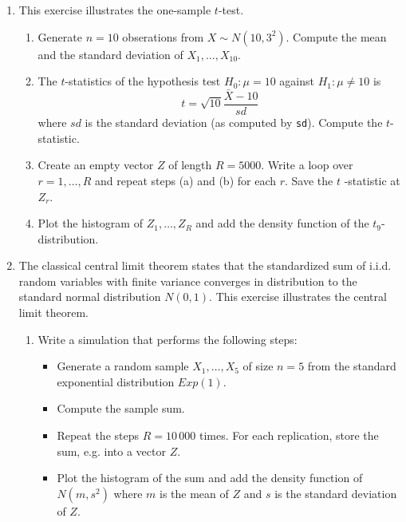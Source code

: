 \documentclass{article}
\begin{document}
\begin{enumerate}
\item This exercise illustrates the one-sample $t$-test.

\begin{enumerate}
\item Generate $n=10$ obserations from $X\sim N(10,3^{2})$. Compute the mean
and the standard deviation of $X_{1},\ldots ,X_{10}$.

\item The $t$-statistics of the hypothesis test $H_{0}:\mu =10$ against $%
H_{1}:\mu \neq 10$ is%
\begin{equation*}
t=\sqrt{10}\frac{\bar{X}-10}{sd}
\end{equation*}%
where $sd$ is the standard deviation (as computed by \texttt{sd}). Compute
the $t$-statistic.

\item Create an empty vector $Z$ of length $R=5000$. Write a loop over $%
r=1,\ldots ,R$ and repeat steps (a) and (b) for each $r$. Save the $t$%
-statistic at $Z_{r}$.

\item Plot the histogram of $Z_{1},\ldots ,Z_{R}$ and add the density
function of the $t_{9}$-distribution.
\end{enumerate}

\item The classical central limit theorem states that the standardized sum
of i.i.d. random variables with finite variance converges in distribution to
the standard normal distribution $N(0,1)$. This exercise illustrates the
central limit theorem.

\begin{enumerate}
\item Write a simulation that performs the following steps:

\begin{itemize}
\item Generate a random sample $X_{1},\ldots ,X_{5}$ of size $n=5$ from the
standard exponential distribution $Exp(1)$.

\item Compute the sample sum.

\item Repeat the steps $R=10\,000$ times. For each replication, store the
sum, e.g. into a vector $Z$.

\item Plot the histogram of the sum and add the density function of $%
N(m,s^{2})$ where $m$ is the mean of $Z$ and $s$ is the standard deviation
of $Z$.
\end{itemize}


\end{enumerate}
\end{enumerate}
\end{document}

